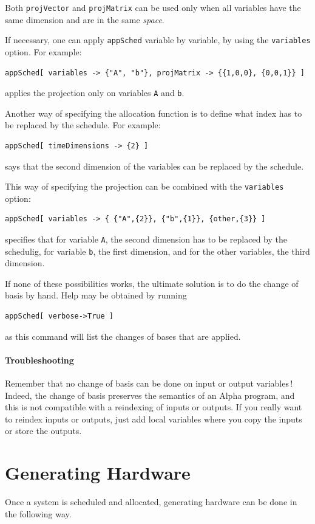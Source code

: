 \documentclass[12pt]{article}
\newcommand{\Alpha}{{\sc Alpha}}
\newcommand{\alfa}{\Alpha}
\begin{document}
Both \texttt{projVector} and \texttt{projMatrix} 
can be used only when all variables have the same dimension
and are in the same {\em space}. 

If necessary, one can apply \texttt{appSched} variable by variable, 
by using the \texttt{variables} option. For example:
\begin{verbatim}
appSched[ variables -> {"A", "b"}, projMatrix -> {{1,0,0}, {0,0,1}} ]
\end{verbatim}
applies the projection only on variables \texttt{A} and \texttt{b}. 

Another way of specifying the allocation function is to define
what index has to be replaced by the schedule. For example:
\begin{verbatim}
appSched[ timeDimensions -> {2} ]
\end{verbatim}
says that the second dimension of the variables can be replaced by
the schedule. 

This way of specifying the projection can be combined with the \texttt{variables} option:
\begin{verbatim}
appSched[ variables -> { {"A",{2}}, {"b",{1}}, {other,{3}} ]
\end{verbatim}
specifies that for variable \texttt{A}, the second dimension has to be replaced
by the schedulig, for variable \texttt{b}, the first dimension, and for the other
variables, the third dimension.

If none of these possibilities works, the ultimate solution is to do the change of basis by hand. 
Help may be obtained by running 
\begin{verbatim}
appSched[ verbose->True ]
\end{verbatim}
as this command will list the changes of bases that are applied. 

\paragraph*{Troubleshooting}
Remember that no change of basis can be done on input or output variables\,! 
Indeed, the change of basis preserves the semantics of an \alfa{} program, and 
this is not compatible with a reindexing of inputs or outputs. If you really want to 
reindex inputs or outputs, just add local variables where you copy the inputs or
store the outputs.

\section{Generating Hardware}
\label{hardware}
Once a system is scheduled and allocated, generating hardware
can be done in the following way.
\end{document}
